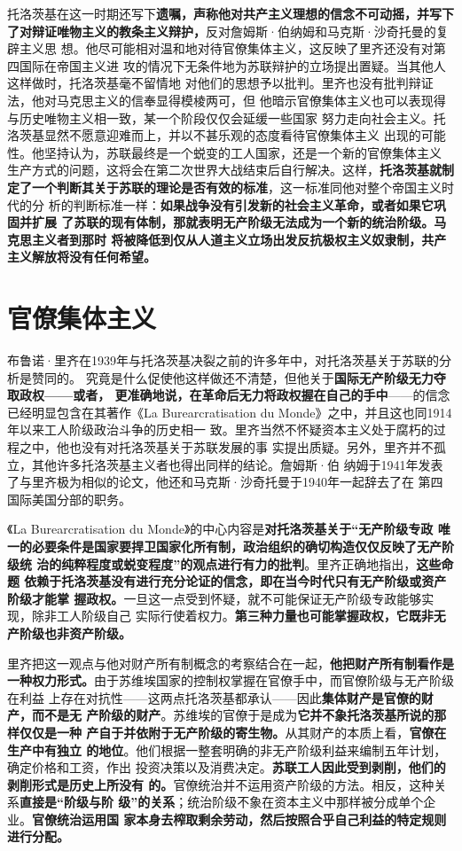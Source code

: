 托洛茨基在这一时期还写下\textbf{遗嘱，声称他对共产主义理想的信念不可动摇，并写下
  了对辩证唯物主义的教条主义辩护，}反对詹姆斯·伯纳姆和马克斯·沙奇托曼的复辟主义思
想。他尽可能相对温和地对待官僚集体主义，这反映了里齐还没有对第四国际在帝国主义进
攻的情况下无条件地为苏联辩护的立场提出置疑。当其他人这样做时，托洛茨基毫不留情地
对他们的思想予以批判。里齐也没有批判辩证法，他对马克思主义的信奉显得模棱两可，但
他暗示官僚集体主义也可以表现得与历史唯物主义相一致，某一个阶段仅仅会延缓一些国家
努力走向社会主义。托洛茨基显然不愿意迎难而上，并以不甚乐观的态度看待官僚集体主义
出现的可能性。他坚持认为，苏联最终是一个蜕变的工人国家，还是一个新的官僚集体主义
生产方式的问题，这将会在第二次世界大战结束后自行解决。这样，\textbf{托洛茨基就制
  定了一个判断其关于苏联的理论是否有效的标准}，这一标准同他对整个帝国主义时代的分
析的判断标准一样：\textbf{如果战争没有引发新的社会主义革命，或者如果它巩固并扩展
  了苏联的现有体制，那就表明无产阶级无法成为一个新的统治阶级。马克思主义者到那时
  将被降低到仅从人道主义立场出发反抗极权主义奴隶制，共产主义解放将没有任何希望。}

\section{官僚集体主义}
布鲁诺·里齐在1939年与托洛茨基决裂之前的许多年中，对托洛茨基关于苏联的分析是赞同的。
究竟是什么促使他这样做还不清楚，但他关于\textbf{国际无产阶级无力夺取政权——或者，
  更准确地说，在革命后无力将政权握在自己的手中}——的信念已经明显包含在其著作《La
Burearcratisation du Monde》之中，并且这也同1914年以来工人阶级政治斗争的历史相一
致。里齐当然不怀疑资本主义处于腐朽的过程之中，他也没有对托洛茨基关于苏联发展的事
实提出质疑。另外，里齐并不孤立，其他许多托洛茨基主义者也得出同样的结论。詹姆斯·伯
纳姆于1941年发表了与里齐极为相似的论文，他还和马克斯·沙奇托曼于1940年一起辞去了在
第四国际美国分部的职务。

《La Burearcratisation du Monde》的中心内容是\textbf{对托洛茨基关于“无产阶级专政
  唯一的必要条件是国家要捍卫国家化所有制，政治组织的确切构造仅仅反映了无产阶级统
  治的纯粹程度或蜕变程度”的观点进行有力的批判}。里齐正确地指出，\textbf{这些命题
  依赖于托洛茨基没有进行充分论证的信念，即在当今时代只有无产阶级或资产阶级才能掌
  握政权。}一旦这一点受到怀疑，就不可能保证无产阶级专政能够实现，除非工人阶级自己
实际行使着权力。\textbf{第三种力量也可能掌握政权，它既非无产阶级也非资产阶级。}

里齐把这一观点与他对财产所有制概念的考察结合在一起，\textbf{他把财产所有制看作是
  一种权力形式。}由于苏维埃国家的控制权掌握在官僚手中，而官僚阶级与无产阶级在利益
上存在对抗性——这两点托洛茨基都承认——因此\textbf{集体财产是官僚的财产，而不是无
  产阶级的财产}。苏维埃的官僚于是成为\textbf{它并不象托洛茨基所说的那样仅仅是一种
  产自于并依附于无产阶级的寄生物。}从其财产的本质上看，\textbf{官僚在生产中有独立
  的地位}。他们根据一整套明确的非无产阶级利益来编制五年计划，确定价格和工资，作出
投资决策以及消费决定。\textbf{苏联工人因此受到剥削，他们的剥削形式是历史上所没有
  的。}官僚统治并不运用资产阶级的方法。相反，这种关系\textbf{直接是“阶级与阶
  级”的关系}；统治阶级不象在资本主义中那样被分成单个企业。\textbf{官僚统治运用国
  家本身去榨取剩余劳动，然后按照合乎自己利益的特定规则进行分配。}

